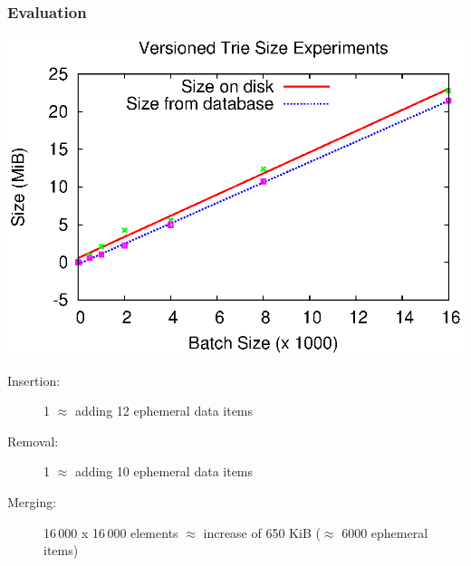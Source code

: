\begin{frame}[fragile]
	\frametitle{Evaluation}

	\begin{minipage}{0.5\textwidth}
		\includegraphics[width=\textwidth]{images/chart.eps}
	\end{minipage}%
	\begin{minipage}{0.5\textwidth}
		\begin{description}
			\item[Insertion:] 1 $\approx$ adding 12 ephemeral data items
			\item[Removal:] 1 $\approx$ adding 10 ephemeral data  items
			\item[Merging:] 16\,000 x 16\,000 elements $\approx$ increase of 650 KiB ($\approx$ 6000 ephemeral items)
		\end{description}
	\end{minipage}

\end{frame}